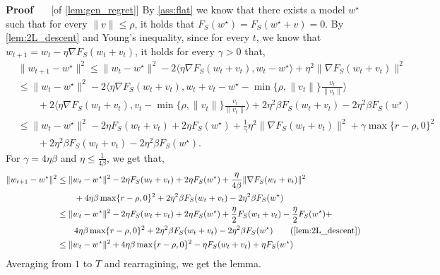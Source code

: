 \documentclass[11pt]{article}
\newcommand{\rad}{r}
\renewenvironment{proof}[1][]{%
  \par\noindent\textbf{\upshape Proof%
  \if\relax\detokenize{#1}\relax\else\ #1\fi}\ %
}{\jmlrQED}
\begin{document}
 \begin{proof} [of \cref{lem:gen_regret}]
     By \cref{ass:flat} we know that there exists a model $w^\star$ such that for every $\|v\| \leq \rho$, it holds that $F_S(w^{\star}) = F_S(w^{\star} + v)=0$. 
By \cref{lem:2L_descent} and Young's inequality, since for every $t$, we know that $w_{t+1}=w_t-\eta\nabla F_S(w_t+v_t)$, it holds for every $\gamma>0$ that,
\begin{align*}
    &\|w_{t+1}-w^\star\|^2
    \leq \|w_{t}-w^\star\|^2 -2\langle \eta \nabla F_S (w_{t}+v_{t}), w_{t}-w^\star \rangle
    +\eta^2\|\nabla F_S (w_{t}+v_{t})\|^2
     \\&\leq \|w_{t}-w^\star\|^2 -2\bigg\langle \eta \nabla F_S (w_{t}+v_{t}), w_{t}+v_t-w^\star - \min\{\rho,\|v_t\|\} \frac{v_t}{\|v_t\|} \bigg\rangle
     \\
     & \qquad +2\bigg\langle \eta \nabla F_S (w_{t}+v_{t}), v_t - \min\{\rho,\|v_t\|\} \frac{v_t}{\|v_t\|} \bigg\rangle  
    +2\eta^2\beta F_S (w_{t}+v_{t}) - 2\eta^2\beta F_S (w^\star)
    \\&\leq \|w_{t}-w^\star\|^2 -2\eta  F_S (w_{t}+v_{t}) + 2\eta F_S(w^\star)
     +\frac{1}{\gamma}\eta ^2\|\nabla F_S (w_{t}+v_{t})\|^2+ \gamma\max\{\rad - \rho, 0\}^2
    \\
     & \qquad 
     +2\eta^2\beta F_S (w_{t}+v_{t}) - 2\eta^2\beta F_S (w^\star).
     \end{align*}
     For $\gamma=4\eta\beta$ and $\eta\leq \frac1{4\beta}$, we get that, 
     \begin{align*}
     \|w_{t+1}-w^\star\|^2&\leq\|w_{t}-w^\star\|^2 -2\eta  F_S (w_{t}+v_{t}) + 2\eta F_S(w^\star)
     +\frac{\eta}{4\beta}\|\nabla F_S (w_{t}+v_{t})\|^2\\&\qquad+ 4\eta\beta\max\{\rad - \rho, 0\}^2 
    +2\eta^2\beta F_S (w_{t}+v_{t}) - 2\eta^2\beta F_S (w^\star)
    \\&\leq \|w_{t}-w^\star\|^2 -2\eta  F_S (w_{t}+v_{t}) + 2\eta F_S(w^\star)
     +\frac{\eta}{2} F_S (w_{t}+v_{t}) -  \frac{\eta}{2} F_S (w^\star) + 
    \\&\qquad 4\eta\beta\max\{\rad - \rho, 0\}^2 +2\eta^2\beta F_S (w_{t}+v_{t}) - 2\eta^2\beta F_S (w^\star) \tag{\cref{lem:2L_descent}}
    \\&\leq \|w_{t}-w^\star\|^2+ 4\eta\beta\max\{\rad - \rho, 0\}^2 -\eta  F_S (w_{t}+v_{t}) + \eta F_S(w^\star)
\end{align*}
Averaging from $1$ to $T$ and rearragining, we get the lemma.
 \end{proof}
\end{document}
